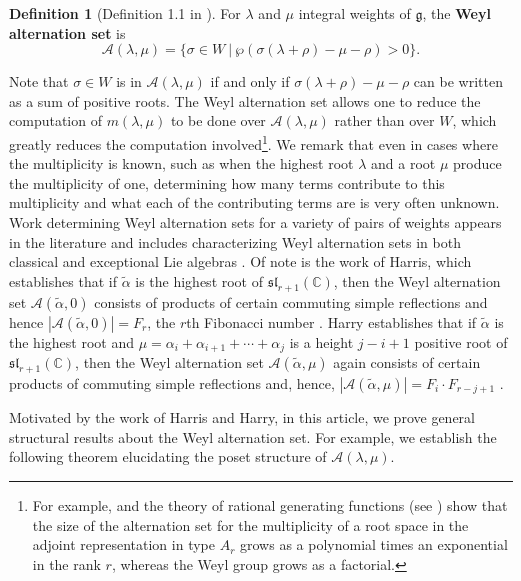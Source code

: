 \documentclass{amsart}
\theoremstyle{definition}
\newtheorem{definition}[theorem]{Definition}
\newcommand{\hroot}{\tilde{\alpha}}
\newcommand{\calA}{\mathcal{A}}
\begin{document}
\begin{definition}[Definition 1.1 in \cite{PHThesisPublication}]
    For $\lambda$ and $\mu$ integral weights of $\mathfrak{g}$, the \textbf{Weyl alternation set} is
    \begin{equation}
        \mathcal{A}(\lambda, \mu) = \{\sigma \in W ~|~ 
 \wp(\sigma(\lambda+\rho)-\mu - \rho)>0\}.
    \end{equation}
\end{definition} 
Note that $\sigma\in W$ is in $\mathcal{A}(\lambda,\mu)$ if and only if $\sigma(\lambda+\rho)-\mu - \rho$ can be written as a sum of positive roots.
The Weyl alternation set allows one to reduce the computation of $m(\lambda,\mu)$ to be done over $\mathcal{A}(\lambda,\mu)$ rather than over $W$, which greatly reduces the computation involved\footnote{For example,  and the theory of rational generating functions (see \cite[Chapter 4]{EC1}) show that the size of the alternation set for the multiplicity of a root space in the adjoint representation in type $A_r$ grows as a polynomial times an exponential in the rank $r$, whereas the Weyl group grows as a factorial.}. 
We remark that even in cases where the multiplicity is known,
such as when the highest root $\lambda$ and a root $\mu$ produce the multiplicity of one, 
determining how many terms contribute to this multiplicity and what each of the contributing terms are
is very often unknown.
Work determining Weyl alternation sets for a variety of pairs of weights appears in the literature and includes characterizing Weyl alternation sets in both classical and exceptional Lie algebras
\cite{MR4015857,MR4747948,MR4452794,MR3792167,MR4707357,MR3774802,MR3825932,Lauren,MR3730711,MR4747948,MR4025421}.
Of note is the work of 
Harris, which establishes that if $\hroot$ is the highest root of $\mathfrak{sl}_{r+1}(\mathbb{C})$, then the Weyl alternation set $\mathcal{A}(\hroot,0)$ consists of products of certain commuting simple reflections and hence $|\mathcal{A}(\hroot,0)|=F_{r}$, the $r$th Fibonacci number \cite[Theorem~1.2]{PHThesisPublication}.
Harry establishes that if $\hroot$ is the highest root and $\mu=\alpha_i+\alpha_{i+1}+\cdots+\alpha_j$ is a height 
$j-i+1$ positive root of $\mathfrak{sl}_{r+1}(\mathbb{C})$, then the Weyl alternation set $\mathcal{A}(\hroot,\mu)$ again consists of certain products of commuting simple reflections and, hence, $|\mathcal{A}(\hroot,\mu)|=F_i \cdot F_{r-j+1}$ \cite[Corollary~2.5]{Harry}.

Motivated by the work of Harris and Harry, in this article, we prove general structural results about the Weyl alternation set. For example, we establish the following theorem elucidating the poset structure of $\calA(\lambda,\mu)$.
\end{document}
